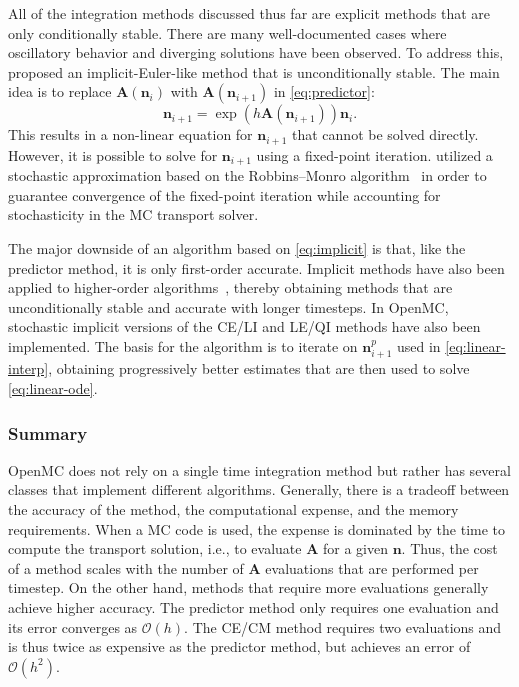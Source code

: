 \documentclass[3p,authoryear]{elsarticle}
\newcommand{\vect}[1]{\mathbf{#1}} %
\begin{document}
All of the integration methods discussed thus far are explicit methods that are
only conditionally stable. There are many well-documented cases where
oscillatory behavior and diverging solutions have been observed. To address
this, \citet{dufek2013ane} proposed an implicit-Euler-like method that is
unconditionally stable. The main idea is to replace $\vect{A}(\vect{n}_i)$ with
$\vect{A}(\vect{n}_{i+1})$ in \cref{eq:predictor}:
\begin{equation}
  \label{eq:implicit}
  \vect{n}_{i+1} = \exp \left( h\vect{A}(\vect{n}_{i+1}) \right) \vect{n}_i.
\end{equation}
This results in a non-linear equation for $\vect{n}_{i+1}$ that cannot be solved
directly. However, it is possible to solve for $\vect{n}_{i+1}$ using a
fixed-point iteration. \citet{dufek2013ane} utilized a stochastic approximation
based on the Robbins--Monro algorithm~\citep{robbins1951ams} in order to
guarantee convergence of the fixed-point iteration while accounting for
stochasticity in the MC transport solver.

The major downside of an algorithm based on \cref{eq:implicit} is that, like the
predictor method, it is only first-order accurate. Implicit methods have also
been applied to higher-order
algorithms~\citep{kotlyar2014ane,kotlyar2016ane,cosgrove2020ane}, thereby
obtaining methods that are unconditionally stable and accurate with longer
timesteps. In OpenMC, stochastic implicit versions of the CE/LI and LE/QI
methods have also been implemented. The basis for the algorithm is to iterate on
$\vect{n}_{i+1}^p$ used in \cref{eq:linear-interp}, obtaining progressively
better estimates that are then used to solve \cref{eq:linear-ode}.

\subsubsection{Summary}

OpenMC does not rely on a single time integration method but rather has several
classes that implement different algorithms. Generally, there is a tradeoff
between the accuracy of the method, the computational expense, and the memory
requirements. When a MC code is used, the expense is dominated by the time
to compute the transport solution, i.e., to evaluate $\vect{A}$ for a given
$\vect{n}$. Thus, the cost of a method scales with the number of $\vect{A}$
evaluations that are performed per timestep. On the other hand, methods that
require more evaluations generally achieve higher accuracy. The predictor method
only requires one evaluation and its error converges as $\mathcal{O}(h)$. The
CE/CM method requires two evaluations and is thus twice as expensive as the
predictor method, but achieves an error of $\mathcal{O}(h^2)$.
\end{document}
